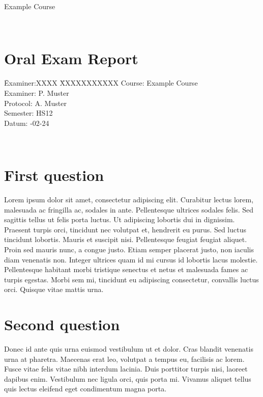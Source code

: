 \documentclass[a4paper,12pt]{article}
\title{\headtitle}
\author{VIS}
\def\headtitle{Example Course} %
\begin{document}
\pagestyle{empty}
\parindent 0pt	%
\flushleft %
%
%
\color[rgb]{0,0,.5}
{\LARGE \headtitle\par}
\hrulefill\\
%
\section*{Oral Exam Report}
\vspace{.5cm}
  \begin{tabbing}
    \quad \= Examiner:XXXX \= XXXXXXXXXXX \kill %
    \>Course:		\>	\headtitle\\[1ex]
    \>Examiner: 	\>	P. Muster\\[1ex]	%
    \>Protocol: 	\>	A. Muster\\[1ex]	%
    \>Semester:	\>	HS12\\[1ex]	%
    \>Datum: 		-02-24%
  \end{tabbing}
%
\hrulefill\\
\color{black}
\vspace{.7cm}

\section{First question}
Lorem ipsum dolor sit amet, consectetur adipiscing elit. Curabitur lectus lorem, malesuada ac fringilla ac, sodales in ante. Pellentesque ultrices sodales felis. Sed sagittis tellus ut felis porta luctus. Ut adipiscing lobortis dui in dignissim. Praesent turpis orci, tincidunt nec volutpat et, hendrerit eu purus. Sed luctus tincidunt lobortis. Mauris et suscipit nisi. Pellentesque feugiat feugiat aliquet. Proin sed mauris nunc, a congue justo. Etiam semper placerat justo, non iaculis diam venenatis non. Integer ultrices quam id mi cursus id lobortis lacus molestie. Pellentesque habitant morbi tristique senectus et netus et malesuada fames ac turpis egestas. Morbi sem mi, tincidunt eu adipiscing consectetur, convallis luctus orci. Quisque vitae mattis urna. 
\section{Second question}
Donec id ante quis urna euismod vestibulum ut et dolor. Cras blandit venenatis urna at pharetra. Maecenas erat leo, volutpat a tempus eu, facilisis ac lorem. Fusce vitae felis vitae nibh interdum lacinia. Duis porttitor turpis nisi, laoreet dapibus enim. Vestibulum nec ligula orci, quis porta mi. Vivamus aliquet tellus quis lectus eleifend eget condimentum magna porta. 
\end{document}
